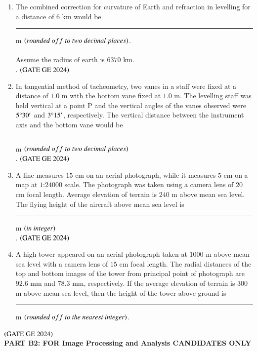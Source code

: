 \documentclass[journal,12pt,onecolumn]{IEEEtran}
\theoremstyle{remark}
\begin{document}
\begin{enumerate}
\item The combined correction for curvature of Earth and refraction in levelling for a distance of $6$ km would be \rule{2cm}{0.5mm} m $\brak{rounded\ off\ to\ two\ decimal\ places}$.\\
\\Assume the radius of earth is $6370$ km.\\.
\hfill $\brak{\text{GATE GE 2024}}$
\bigskip
\item In tangential method of tacheometry, two vanes in a staff were fixed at a distance of $1.0$ m with the bottom vane fixed at $1.0$ m.
The levelling staff was held vertical at a point P and the vertical angles of the vanes observed were $5\degree30'$ and $3\degree15'$, respectively.
The vertical distance between the instrument axis and the bottom vane would be \rule{2cm}{0.5mm} m $\brak{rounded\ off\ to\ two\ decimal\ places}$\\.
\hfill $\brak{\text{GATE GE 2024}}$
\bigskip
\item A line measures $15$ cm on an aerial photograph, while it measures $5$ cm on a map at $1$:$24000$ scale.
The photograph was taken using a camera lens of $20$ cm focal length.
Average elevation of terrain is $240$ m above mean sea level.
The flying height of the aircraft above mean sea level is \rule{2cm}{0.5mm} m $\brak{in\ integer}$\\.
\hfill $\brak{\text{GATE GE 2024}}$
\bigskip
\item A high tower appeared on an aerial photograph taken at $1000$ m above mean sea level with a camera lens of $15$ cm focal length.
The radial distances of the top and bottom images of the tower from principal point of photograph are $92.6$ mm and $78.3$ mm, respectively.
If the average elevation of terrain is $300$ m above mean sea level, then the height of the tower above ground is \rule{2cm}{0.5mm} m $\brak{rounded\ off\ to\ the\ nearest\ integer}$.
\end{enumerate}
\hfill $\brak{\text{GATE GE 2024}}$
\bigskip
\\
\textbf{PART B2: FOR Image Processing and Analysis CANDIDATES ONLY}\\
\\
\end{document}
